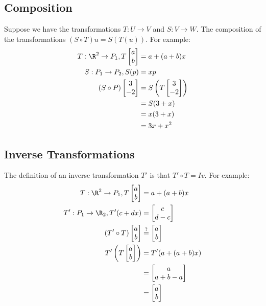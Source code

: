 \documentclass{math}
\begin{document}
\subsection*{Composition}
Suppose we have the transformations \( T:U\to V \) and \( S:V\to W \). The
composition of the transformations \( (S\circ T)u = S(T(u)) \). For example:
\begin{align*}
  T:\R^2\to P_1, T\begin{bmatrix}a \\ b\end{bmatrix} &= a+(a+b)x \\
  S:P_1\to P_2, S(p) &= xp \\
  (S\circ P)\begin{bmatrix}3 \\ -2\end{bmatrix} &=
    S\left(T\begin{bmatrix}3 \\ -2\end{bmatrix}\right) \\
  &= S(3+x) \\
  &= x(3+x) \\
  &= 3x+x^2
\end{align*}

\subsection*{Inverse Transformations}
The definition of an inverse transformation \( T' \) is that
\( T'\circ T = Iv \). For example:
\begin{align*}
  T:\R^2\to P_1, T\begin{bmatrix}a \\ b\end{bmatrix} &= a+(a+b)x \\
  T':P_1\to\R_2, T'(c+dx) &= \begin{bmatrix}c \\ d-c\end{bmatrix} \\
  (T'\circ T)\begin{bmatrix}a \\ b\end{bmatrix} &\stackrel{?}{=}
    \begin{bmatrix}a \\ b\end{bmatrix} \\
  T'\left(T\begin{bmatrix}a \\ b\end{bmatrix}\right) &=
    T'(a+(a+b)x) \\
  &= \begin{bmatrix}a \\ a+b-a\end{bmatrix} \\
  &= \begin{bmatrix}a \\ b\end{bmatrix}
\end{align*}
\end{document}
